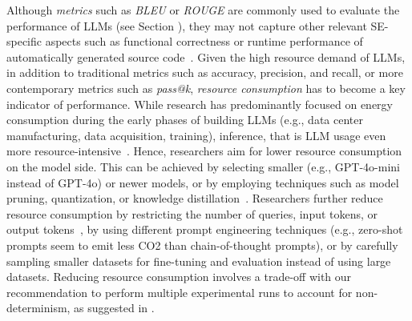 
Although \emph{metrics} such as \emph{BLEU} or \emph{ROUGE} are commonly used to evaluate the performance of LLMs (see Section \benchmarksmetrics), they may not capture other relevant SE-specific aspects such as functional correctness or runtime performance of automatically generated source code~\cite{DBLP:conf/nips/LiuXW023}.
Given the high resource demand of LLMs, in addition to traditional metrics such as accuracy, precision, and recall, or more contemporary metrics such as \emph{pass@k}, \emph{resource consumption} has to become a key indicator of performance. %
While research has predominantly focused on energy consumption during the early phases of building LLMs (e.g., data center manufacturing, data acquisition, training), inference, that is LLM usage  even more resource-intensive~\cite{DBLP:conf/mlsys/WuRGAAMCBHBGGOM22, DBLP:journals/corr/abs-2410-02950, JIANG2024202, mitu2024hidden}.
Hence, researchers \should aim for lower resource consumption on the model side.
This can be achieved by selecting smaller (e.g., GPT-4o-mini instead of GPT-4o) or newer models, or by employing techniques such as model pruning, quantization, or knowledge distillation~\cite{mitu2024hidden}.
Researchers \added{\should} further reduce resource consumption by restricting the number of queries, input tokens, or output tokens~\cite{mitu2024hidden}, by using different prompt engineering techniques (e.g., zero-shot prompts seem to emit less CO2 than chain-of-thought prompts), or by carefully sampling smaller datasets for fine-tuning and evaluation instead of using large datasets.
Reducing resource consumption involves a trade-off with our recommendation to perform multiple experimental runs to account for non-determinism, as suggested in \benchmarksmetrics.
